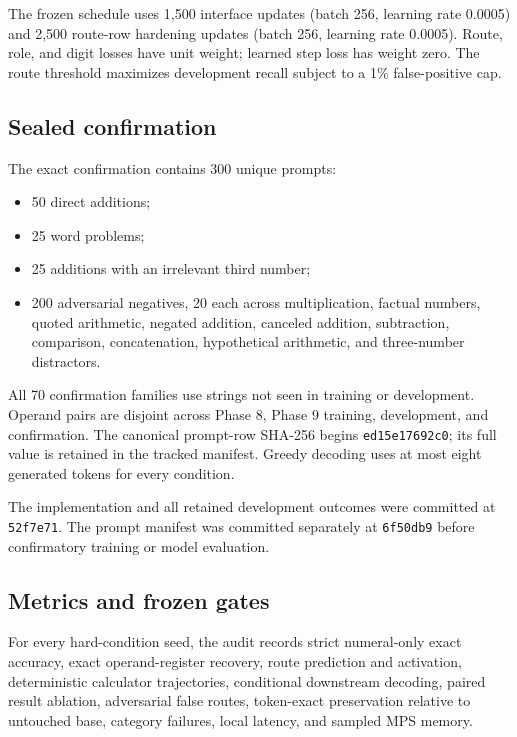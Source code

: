 \documentclass[11pt]{article}
\newcommand{\code}[1]{\texttt{#1}}
\begin{document}
The frozen schedule uses 1,500 interface updates (batch 256, learning rate
0.0005) and 2,500 route-row hardening updates (batch 256, learning rate
0.0005). Route, role, and digit losses have unit weight; learned step loss has
weight zero. The route threshold maximizes development recall subject to a
1\% false-positive cap.

\subsection{Sealed confirmation}

The exact confirmation contains 300 unique prompts:

\begin{itemize}
\item 50 direct additions;
\item 25 word problems;
\item 25 additions with an irrelevant third number;
\item 200 adversarial negatives, 20 each across multiplication, factual
      numbers, quoted arithmetic, negated addition, canceled addition,
      subtraction, comparison, concatenation, hypothetical arithmetic, and
      three-number distractors.
\end{itemize}

All 70 confirmation families use strings not seen in training or development.
Operand pairs are disjoint across Phase 8, Phase 9
training, development, and confirmation. The canonical prompt-row SHA-256
begins \code{ed15e17692c0}; its full value is retained in the tracked
manifest. Greedy decoding uses at most eight generated tokens for every
condition.

The implementation and all retained development outcomes were committed at
\code{52f7e71}. The prompt manifest was committed separately at
\code{6f50db9} before confirmatory training or model evaluation.

\subsection{Metrics and frozen gates}

For every hard-condition seed, the audit records strict numeral-only exact
accuracy, exact operand-register recovery, route prediction and activation,
deterministic calculator trajectories, conditional downstream decoding,
paired result ablation, adversarial false routes, token-exact preservation
relative to untouched base, category failures, local latency, and sampled MPS
memory.
\end{document}
